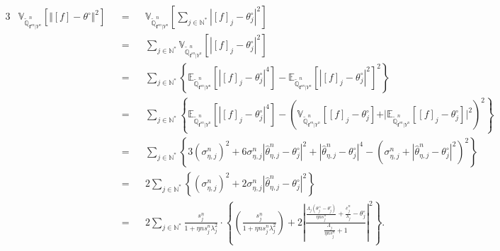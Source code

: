 \begin{alignat*}{3}
&\mathds{V}_{\widetilde{\mathds{Q}}_{\boldsymbol{f}^{s{n}} \vert Y^{n}}^{n}}\left[\Vert [f] - \theta^{\circ} \Vert^{2}\right] &&=&& \mathds{V}_{\widetilde{\mathds{Q}}_{\boldsymbol{f}^{s{n}} \vert Y^{n}}^{n}}\left[\sum\limits_{j \in \mathds{N^{*}}} \left\vert[f]_{j} - \theta^{\circ}_{j} \right\vert^{2}\right]\\
& &&=&& \sum\limits_{j \in \mathds{N^{*}}}\mathds{V}_{\widetilde{\mathds{Q}}_{\boldsymbol{f}^{s{n}} \vert Y^{n}}^{n}}\left[\left\vert[f]_{j} - \theta^{\circ}_{j} \right\vert^{2}\right]\\
& &&=&& \sum\limits_{j \in \mathds{N^{*}}}\left\{\mathds{E}_{\widetilde{\mathds{Q}}_{\boldsymbol{f}^{s{n}} \vert Y^{n}}^{n}}\left[\left\vert[f]_{j} - \theta^{\circ}_{j} \right\vert^{4}\right] - \mathds{E}_{\widetilde{\mathds{Q}}_{\boldsymbol{f}^{s{n}} \vert Y^{n}}^{n}}\left[\left\vert[f]_{j} - \theta^{\circ}_{j} \right\vert^{2}\right]^{2}\right\}\\
& &&=&& \sum\limits_{j \in \mathds{N^{*}}}\left\{\mathds{E}_{\widetilde{\mathds{Q}}_{\boldsymbol{f}^{s{n}} \vert Y^{n}}^{n}}\left[\left\vert[f]_{j} - \theta^{\circ}_{j} \right\vert^{4}\right] - \left(\mathds{V}_{\widetilde{\mathds{Q}}_{\boldsymbol{f}^{s{n}} \vert Y^{n}}^{n}}\left[[f]_{j} - \theta^{\circ}_{j}\right] + \vert\mathds{E}_{\widetilde{\mathds{Q}}_{\boldsymbol{f}^{s{n}} \vert Y^{n}}^{n}}\left[[f]_{j} - \theta^{\circ}_{j}\right]\vert^{2}\right)^{2}\right\}\\
& &&=&& \sum\limits_{j \in \mathds{N^{*}}}\left\{3 \left(\sigma_{\eta, j}^{n}\right)^{2} + 6 \sigma_{\eta, j}^{n} \left\vert\widehat{\theta}_{\eta, j}^{n} - \theta^{\circ}_{j}\right\vert^{2} + \left\vert\widehat{\theta}_{\eta, j}^{n} - \theta^{\circ}_{j}\right\vert^{4} - \left(\sigma_{\eta, j}^{n} + \left\vert\widehat{\theta}_{\eta, j}^{n} - \theta^{\circ}_{j}\right\vert^{2}\right)^{2}\right\}\\
& &&=&& 2 \sum\limits_{j \in \mathds{N^{*}}}\left\{ \left(\sigma_{\eta, j}^{n}\right)^{2} + 2 \sigma_{\eta, j}^{n} \left\vert\widehat{\theta}_{\eta, j}^{n} - \theta^{\circ}_{j}\right\vert^{2}\right\}\\
& &&=&& 2 \sum\limits_{j \in \mathds{N^{*}}}\frac{s_{j}^{n}}{1 + \eta n s_{j}^{n} \lambda_{j}^{2}} \cdot \left\{ \left(\frac{s_{j}^{n}}{1 + \eta n s_{j}^{n} \lambda_{j}^{2}}\right) + 2 \left\vert\frac{\frac{\Lambda_{j}\left(\theta^{\times}_{j} - \theta^{\circ}_{j}\right)}{\eta n s_{j}^{n}} + \frac{\overline{e}_{j}^{n}}{\lambda_{j}}- \theta^{\circ}_{j}}{\frac{\Lambda_{j}}{\eta n s_{j}^{n}} + 1}\right\vert^{2}\right\}.
\end{alignat*}

